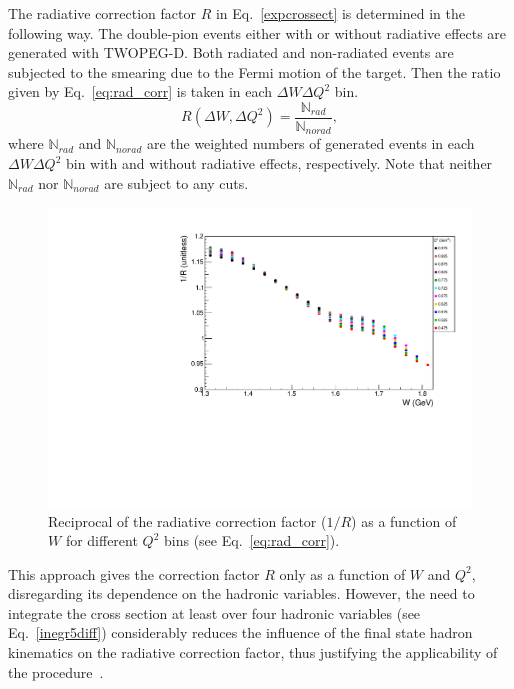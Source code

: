 The radiative correction factor $R$ in Eq.~\eqref{expcrossect} is determined in the following way. The double-pion events either with or without radiative effects are generated with TWOPEG-D. Both radiated and non-radiated events are subjected to the smearing due to the Fermi motion of the target. Then the ratio given by Eq.~\eqref{eq:rad_corr} is taken in each $\Delta W \Delta Q^{2}$ bin.
\begin{equation}
R(\Delta W, \Delta Q^{2}) = \frac{\mathbb{N}_{rad}}{\mathbb{N}_{norad}},
\label{eq:rad_corr}
\end{equation}
where $\mathbb{N}_{rad}$ and $\mathbb{N}_{norad}$ are the weighted numbers of generated events in each $\Delta W \Delta Q^{2}$ bin with and without radiative effects, respectively. Note that neither $\mathbb{N}_{rad}$ nor $\mathbb{N}_{norad}$ are subject to any cuts.

\begin{figure}[htp]
\begin{center}
\includegraphics[width=13cm]{pictures/corrections/radcorr.pdf}
\caption{\small Reciprocal of the radiative correction factor ($1/R$) as a function of $W$ for different $Q^{2}$ bins (see Eq.~\eqref{eq:rad_corr}).} \label{fig:radcorr}
\end{center}
\end{figure}

This approach gives the correction factor $R$ only as a function of $W$ and $Q^{2}$, disregarding its dependence on the hadronic variables. However, the need to integrate the cross section at least over four hadronic variables (see Eq.~\eqref{inegr5diff}) considerably reduces the influence of the final state hadron kinematics on the radiative correction factor, thus justifying the applicability of the procedure~\cite{Mo:1968cg,twopeg,twopeg-d}.

